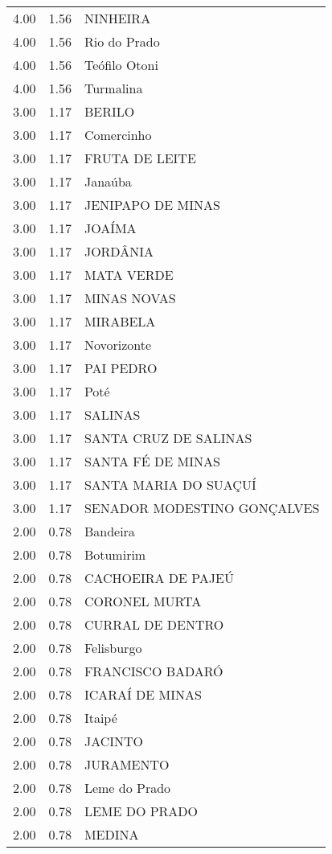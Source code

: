 \documentclass[a4paper, 12pt, openright, oneside, english, brazil, article]{abntex2}
\begin{document}
\begin{scriptsize}
\begin{longtable}{rrl}
		4.00 & 1.56 & NINHEIRA \\ 
		4.00 & 1.56 & Rio do Prado \\ 
		4.00 & 1.56 & Teófilo Otoni \\ 
		4.00 & 1.56 & Turmalina \\ 
		3.00 & 1.17 & BERILO \\ 
		3.00 & 1.17 & Comercinho \\ 
		3.00 & 1.17 & FRUTA DE LEITE \\ 
		3.00 & 1.17 & Janaúba \\ 
		3.00 & 1.17 & JENIPAPO DE MINAS \\ 
		3.00 & 1.17 & JOAÍMA \\ 
		3.00 & 1.17 & JORDÂNIA \\ 
		3.00 & 1.17 & MATA VERDE \\ 
		3.00 & 1.17 & MINAS NOVAS \\ 
		3.00 & 1.17 & MIRABELA \\ 
		3.00 & 1.17 & Novorizonte \\ 
		3.00 & 1.17 & PAI PEDRO \\ 
		3.00 & 1.17 & Poté \\ 
		3.00 & 1.17 & SALINAS \\ 
		3.00 & 1.17 & SANTA CRUZ DE SALINAS \\ 
		3.00 & 1.17 & SANTA FÉ DE MINAS \\ 
		3.00 & 1.17 & SANTA MARIA DO SUAÇUÍ \\ 
		3.00 & 1.17 & SENADOR MODESTINO GONÇALVES \\ 
		2.00 & 0.78 & Bandeira \\ 
		2.00 & 0.78 & Botumirim \\ 
		2.00 & 0.78 & CACHOEIRA DE PAJEÚ \\ 
		2.00 & 0.78 & CORONEL MURTA \\ 
		2.00 & 0.78 & CURRAL DE DENTRO \\ 
		2.00 & 0.78 & Felisburgo \\ 
		2.00 & 0.78 & FRANCISCO BADARÓ \\ 
		2.00 & 0.78 & ICARAÍ DE MINAS \\ 
		2.00 & 0.78 & Itaipé \\ 
		2.00 & 0.78 & JACINTO \\ 
		2.00 & 0.78 & JURAMENTO \\ 
		2.00 & 0.78 & Leme do Prado \\ 
		2.00 & 0.78 & LEME DO PRADO \\ 
		2.00 & 0.78 & MEDINA \\ 

\end{longtable}
\end{scriptsize}
\end{document}

